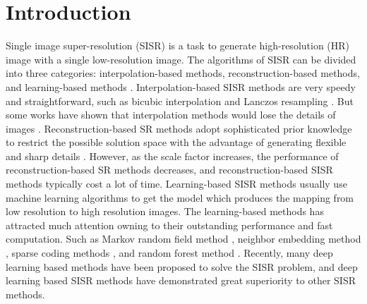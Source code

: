 \documentclass[10pt,twocolumn,letterpaper]{article}
\begin{document}
\section{Introduction}
Single image super-resolution (SISR) is a task to generate high-resolution (HR) image with a single low-resolution image. The algorithms of SISR can be divided into three categories: interpolation-based methods, reconstruction-based methods, and learning-based methods \cite{yang2019deep}. Interpolation-based SISR methods are very speedy and straightforward, such as bicubic interpolation \cite{keys1981cubic} and Lanczos
resampling \cite{duchon1979lanczos}. But some works have shown that interpolation
methods would lose the details of images \cite{yang2010image,dong2015image}.
Reconstruction-based SR methods \cite{dai2009softcuts,sun2008image,yan2015single} adopt sophisticated prior knowledge to restrict the possible solution space with the advantage of generating flexible and sharp details \cite{yang2019deep}. However, as the scale factor increases, the performance of reconstruction-based SR methods decreases, and reconstruction-based SISR methods typically cost a lot of time. Learning-based SISR methods usually use machine learning algorithms to get the model which produces the mapping from low resolution to high resolution images. The learning-based methods has attracted much attention owning to their outstanding performance and fast computation. Such as Markov random field method \cite{freeman2002example}, neighbor embedding method \cite{chang2004super}, sparse coding methods \cite{yang2010image,zeyde2010single,timofte2013anchored}, and random forest method \cite{schulter2015fast}. Recently, many deep learning based methods have been proposed to solve the SISR problem, and deep learning based SISR methods have demonstrated great superiority to other SISR methods.
\end{document}
